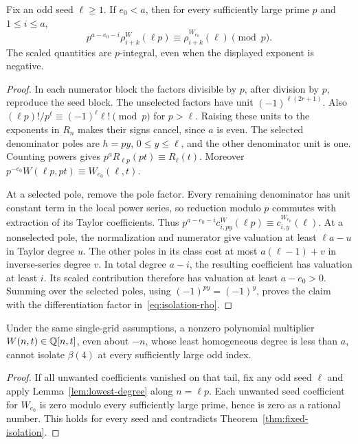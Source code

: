 \begin{lemma}\label{lem:lowest-degree}
Fix an odd seed $\ell\ge1$. If $e_0<a$, then for every sufficiently
large prime $p$ and $1\le i\le a$,
\[
 p^{a-e_0-i}\rho_{i+k}^{W}(\ell p)
               \equiv\rho_{i+k}^{W_{e_0}}(\ell)\pmod p.
\]
The scaled quantities are $p$-integral, even when the displayed
exponent is negative.
\end{lemma}
\begin{proof}
In each numerator block the factors divisible by $p$, after division
by $p$, reproduce the seed block. The unselected factors have unit
$(-1)^{\ell(2r+1)}$. Also
$(\ell p)!/p^\ell\equiv(-1)^\ell\ell!\pmod p$ for $p>\ell$.
Raising these units to the exponents in $R_n$ makes their signs cancel,
since $a$ is even. The selected denominator poles are $h=py$,
$0\le y\le\ell$, and the other denominator unit is one. Counting
powers gives $p^aR_{\ell p}(pt)\equiv R_\ell(t)$.
Moreover
$p^{-e_0}W(\ell p,pt)\equiv W_{e_0}(\ell,t)$.

At a selected pole, remove the pole factor. Every remaining denominator
has unit constant term in the local power series, so reduction modulo
$p$ commutes with extraction of its Taylor coefficients. Thus
$p^{a-e_0-i}c_{i,py}^W(\ell p)\equiv c_{i,y}^{W_{e_0}}(\ell)$.
At a nonselected pole, the normalization and numerator give valuation
at least $\ell a-u$ in Taylor degree $u$. The other poles in its class
cost at most $a(\ell-1)+v$ in inverse-series degree $v$. In total
degree $a-i$, the resulting coefficient has valuation at least $i$.
Its scaled contribution therefore has valuation at least $a-e_0>0$.
Summing over the selected poles, using $(-1)^{py}=(-1)^y$, proves the
claim with the differentiation factor in~\eqref{eq:isolation-rho}.
\end{proof}

\begin{theorem}\label{thm:polynomial-isolation}
Under the same single-grid assumptions, a nonzero polynomial multiplier
$W(n,t)\in\mathbb Q[n,t]$, even about $-n$, whose least homogeneous degree is
less than $a$, cannot isolate $\beta(4)$ at every sufficiently large odd
index.
\end{theorem}
\begin{proof}
If all unwanted coefficients vanished on that tail, fix any odd seed
$\ell$ and apply Lemma~\ref{lem:lowest-degree} along $n=\ell p$.
Each unwanted seed coefficient for $W_{e_0}$ is zero modulo every
sufficiently large prime, hence is zero as a rational number. This
holds for every seed and contradicts Theorem~\ref{thm:fixed-isolation}.
\end{proof}

